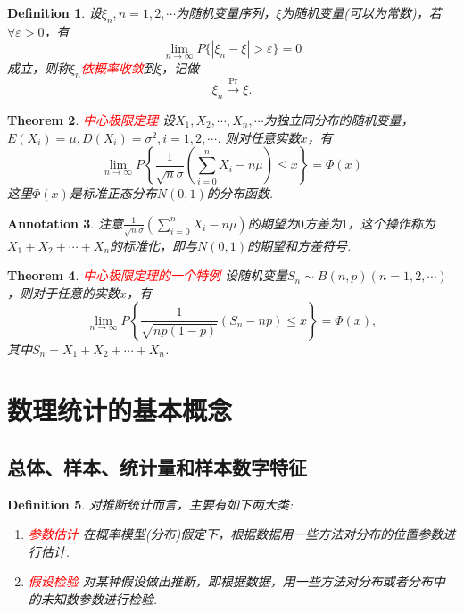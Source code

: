 \documentclass{article}
\newtheorem{theorem}{Theorem}[section]
\newtheorem{definition}[theorem]{Definition}
\newtheorem{annotation}[theorem]{Annotation}
\newcommand{\redt}[1]{\textcolor{red}{#1}}
\begin{document}
\begin{definition}
\rm 设$\xi_n, n = 1,2,\cdots$为随机变量序列，$\xi$为随机变量(可以为常数)，若$\forall \varepsilon > 0$，有
$$
\lim\limits_{n \to \infty} P\{ |\xi_n -\xi| > \varepsilon \} = 0
$$
成立，则称$\xi_n$\redt{依概率收敛}到$\xi$，记做
$$
\xi_n \xrightarrow{\text{Pr}} \xi.
$$
\end{definition}


\begin{theorem}
\rm \redt{中心极限定理} 设$X_1,X_2,\cdots,X_n,\cdots$为独立同分布的随机变量，$E(X_i)=\mu,D(X_i)=\sigma^2,i=1,2,\cdots$. 则对任意实数$x$，有
$$
\lim\limits_{n \rightarrow \infty}P\left\{\frac{1}{\sqrt{n}\sigma}\left(\sum\limits_{i=0}^nX_i - n\mu \right) \leq x\right\} = \Phi(x)
$$
这里$\Phi(x)$是标准正态分布$N(0,1)$的分布函数. 
\end{theorem}



\begin{annotation}
\rm 注意$\frac{1}{\sqrt{n}\sigma}(\sum\limits_{i=0}^nX_i - n\mu)$的期望为$0$方差为$1$，这个操作称为$X_1 + X_2 +\cdots + X_n$的标准化，即与$N(0,1)$的期望和方差符号. 
\end{annotation}

\begin{theorem}
\rm \redt{中心极限定理的一个特例} 设随机变量$S_n \sim B(n,p)(n=1,2,\cdots)$，则对于任意的实数$x$，有
$$
\lim\limits_{n \rightarrow \infty}P\left\{\frac{1}{\sqrt{np(1-p)}}(S_n - np) \leq x\right\} = \Phi(x),
$$
其中$S_n = X_1+X_2+\cdots + X_n$. 
\end{theorem}


\newpage
\section{数理统计的基本概念}

\subsection{总体、样本、统计量和样本数字特征}

\begin{definition}
\rm 对推断统计而言，主要有如下两大类:
\begin{enumerate}
	\item \redt{参数估计} 在概率模型(分布)假定下，根据数据用一些方法对分布的位置参数进行估计. 
	\item \redt{假设检验} 对某种假设做出推断，即根据数据，用一些方法对分布或者分布中的未知数参数进行检验. 
\end{enumerate}
\end{definition}
\end{document}
